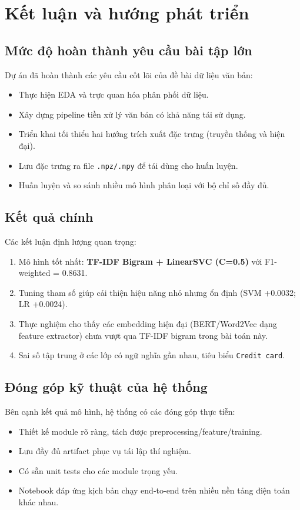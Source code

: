 \section{Kết luận và hướng phát triển}

\subsection{Mức độ hoàn thành yêu cầu bài tập lớn}
Dự án đã hoàn thành các yêu cầu cốt lõi của đề bài dữ liệu văn bản:
\begin{itemize}[nosep]
    \item Thực hiện EDA và trực quan hóa phân phối dữ liệu.
    \item Xây dựng pipeline tiền xử lý văn bản có khả năng tái sử dụng.
    \item Triển khai tối thiểu hai hướng trích xuất đặc trưng (truyền thống và hiện đại).
    \item Lưu đặc trưng ra file \texttt{.npz/.npy} để tái dùng cho huấn luyện.
    \item Huấn luyện và so sánh nhiều mô hình phân loại với bộ chỉ số đầy đủ.
\end{itemize}

\subsection{Kết quả chính}
Các kết luận định lượng quan trọng:
\begin{enumerate}[nosep]
    \item Mô hình tốt nhất: \textbf{TF-IDF Bigram + LinearSVC (C=0.5)} với F1-weighted = 0.8631.
    \item Tuning tham số giúp cải thiện hiệu năng nhỏ nhưng ổn định (SVM +0.0032; LR +0.0024).
    \item Thực nghiệm cho thấy các embedding hiện đại (BERT/Word2Vec dạng feature extractor) chưa vượt qua TF-IDF bigram trong bài toán này.
    \item Sai số tập trung ở các lớp có ngữ nghĩa gần nhau, tiêu biểu \texttt{Credit card}.
\end{enumerate}

\subsection{Đóng góp kỹ thuật của hệ thống}
Bên cạnh kết quả mô hình, hệ thống có các đóng góp thực tiễn:
\begin{itemize}[nosep]
    \item Thiết kế module rõ ràng, tách được preprocessing/feature/training.
    \item Lưu đầy đủ artifact phục vụ tái lập thí nghiệm.
    \item Có sẵn unit tests cho các module trọng yếu.
    \item Notebook đáp ứng kịch bản chạy end-to-end trên nhiều nền tảng điện toán khác nhau.
\end{itemize}

